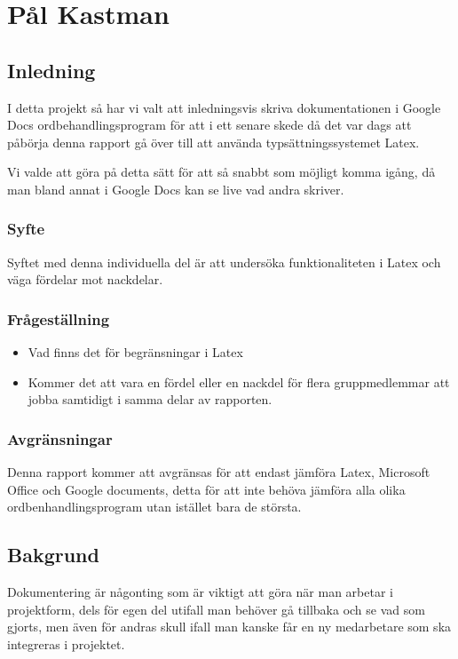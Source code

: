 \section{Pål Kastman}
\subsection{Inledning}
I detta projekt så har vi valt att inledningsvis skriva dokumentationen i Google Docs ordbehandlingsprogram för att 
i ett senare skede då det var dags att påbörja denna rapport gå över till att använda typsättningssystemet Latex. 

Vi valde att göra på detta sätt för att så snabbt som möjligt komma igång, då man bland annat i Google Docs kan se live 
vad andra skriver.

\subsubsection{Syfte}
Syftet med denna individuella del är att undersöka funktionaliteten i Latex och väga fördelar mot nackdelar.

\subsubsection{Frågeställning}
\begin{itemize}
\item Vad finns det för begränsningar i Latex
\item Kommer det att vara en fördel eller en nackdel för flera gruppmedlemmar att jobba samtidigt i samma delar av rapporten.
\end{itemize}

\subsubsection{Avgränsningar}
Denna rapport kommer att avgränsas för att endast jämföra Latex, Microsoft Office och Google documents, detta för att 
inte behöva jämföra alla olika ordbenhandlingsprogram utan istället bara de största.

\subsection{Bakgrund}
Dokumentering är någonting som är viktigt att göra när man arbetar i projektform, dels för egen del utifall man behöver 
gå tillbaka och se vad som gjorts, men även för andras skull ifall man kanske får en ny medarbetare som ska integreras i 
projektet.


